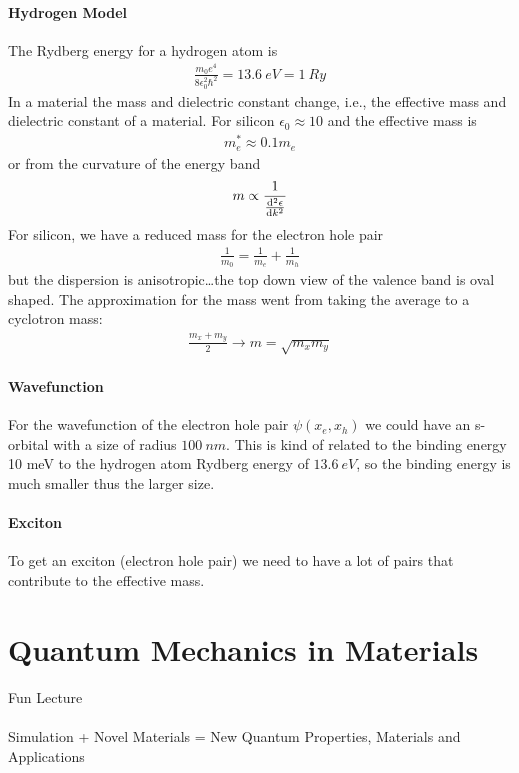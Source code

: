\documentclass[../main.tex]{subfiles}
\begin{document}
\paragraph*{Hydrogen Model} The Rydberg energy for a hydrogen atom is
\begin{align*}
    \frac{m_0 e^4}{8 \epsilon_0^2 \hbar^2} = \qty{13.6}{eV} = \qty{1}{Ry}
\end{align*}
In a material the mass and dielectric constant change, i.e., the effective mass and dielectric
constant of a material. For silicon $\epsilon_0 \approx 10$ and the effective mass is
\begin{align*}
    m_e^* \approx 0.1 m_e
\end{align*}
or from the curvature of the energy band
\begin{align*}
    m \propto \frac{1}{\dv{^2 \epsilon}{k^2}}
\end{align*}
For silicon, we have a reduced mass for the electron hole pair
\begin{align*}
    \frac{1}{m_0} = \frac{1}{m_e} + \frac{1}{m_h}
\end{align*}
but the dispersion is anisotropic\dots the top down view of the valence band is oval shaped.
The approximation for the mass went from taking the average to a cyclotron mass:
\begin{align*}
    \frac{m_x + m_y}{2} \to m = \sqrt{m_x m_y}
\end{align*}
\paragraph*{Wavefunction}
For the wavefunction of the electron hole pair $\psi(x_e, x_h)$ we could have an s-orbital with a 
size of radius $\qty{100}{nm}$. This is kind of related to the binding energy 10 meV to the hydrogen
atom Rydberg energy of $\qty{13.6}{eV}$, so the binding energy is much smaller thus the larger size.

\paragraph*{Exciton} To get an exciton (electron hole pair) we need to have a lot of pairs that
contribute to the effective mass. 

\newpage
\section*{Quantum Mechanics in Materials} Fun Lecture

\paragraph*{}
Simulation + Novel Materials = New Quantum Properties, Materials and Applications
\end{document}
